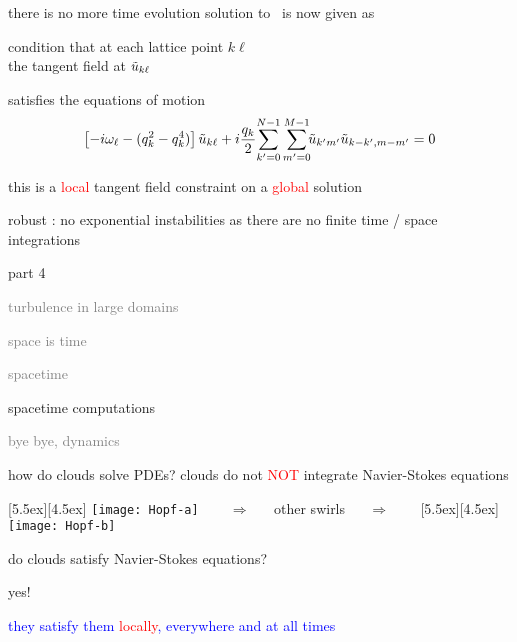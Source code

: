\begin{frame}{there is no more time evolution}
solution to \KS\ is now given as
\begin{block}{condition that}
at each lattice point $k\ell$ \\
the tangent field at $\tilde{u}_{k\ell}$
\end{block}
satisfies the equations of motion
\[
\left[- i \omega_\ell - ( q_k^2 - q_k^4 ) \right]\tilde{u}_{k\ell}
+ i \frac{q_k}{2} \!\sum_{k'=0}^{N-1} \sum^{M-1}_{m'=0}\!\!
\tilde{u}_{k'm'} \tilde{u}_{k-k',m-m'}
    =
0
\]

\bigskip

this is a \textcolor{red}{local} tangent field constraint on a \textcolor{red}{global} solution

\bigskip

robust : no exponential instabilities as there are no finite time / space integrations

\end{frame}

\begin{frame}{part 4}
\begin{enumerate}
              \item
    \textcolor{gray}{\small
turbulence in large domains
              \item
space is time
              \item
spacetime    }
              \item {\Large
spacetime computations
    }\textcolor{gray}{\small
              \item
bye bye, dynamics
                    }
            \end{enumerate}
\end{frame}

\begin{frame}{how do clouds solve PDEs?}
clouds do not \textcolor{red}{\Huge NOT} {integrate} Navier-Stokes equations

\bigskip\bigskip

\begin{center}
\begin{minipage}[t]{\textwidth}
	\begin{center}
\centerline{
\raisebox{-4.0ex}[5.5ex][4.5ex]
		 {\texttt{[image: Hopf-a]}}
~~~ $\Longrightarrow$ ~~ {other swirls} ~~ $\Longrightarrow$ ~~~
	\raisebox{-4.0ex}[5.5ex][4.5ex]
		 {\texttt{[image: Hopf-b]}}
          }
	\end{center}
\end{minipage}
\end{center}

do clouds satisfy Navier-Stokes equations?

\bigskip

{\Large yes!}

\centerline{
\textcolor{blue}{they satisfy them \textcolor{red}{\large locally}, everywhere and at all times}
}
\end{frame}


